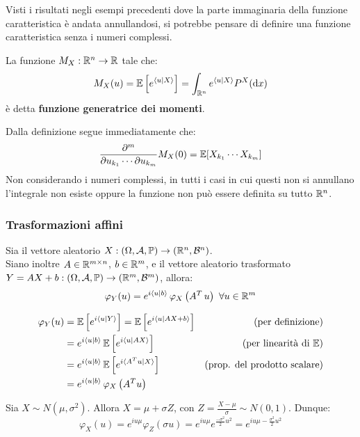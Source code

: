 \medskip
Visti i risultati negli esempi precedenti dove la parte immaginaria della funzione caratteristica è andata annullandosi, si potrebbe pensare di definire una funzione caratteristica senza i numeri complessi.
\begin{defn}\label{funz-gen-mom}
  La funzione $M_X:\mathbb R^n \to \mathbb R$ tale che:
  $$M_X(u)=\mathbb E\left[e^{\langle u|X\rangle}\right]=\int_{\mathbb R^n}e^{\langle u|X\rangle}P^X(\mathrm d x)$$
  è detta \textbf{funzione generatrice dei momenti}.
\end{defn}

Dalla definizione segue immediatamente che:
$$\frac{\partial^m}{\partial u_{k_1} \cdots \partial u_{k_m}}M_X(0)=\mathbb E[X_{k_1} \cdots X_{k_m}]$$
Non considerando i numeri complessi, in tutti i casi in cui questi non si annullano l'integrale non esiste oppure la funzione non può essere definita su tutto $\mathbb R^n$.

\subsubsection{Trasformazioni affini}

\begin{teob}[\JPTh{13.3}]\label{phi-trasf-aff}
  Sia il vettore aleatorio $X : \DoCo$. \\
  Siano inoltre $A\in \mathbb R^{m\times n}$, $b\in \mathbb R^m$, e il vettore aleatorio trasformato $Y=AX+b : \DoCo[m]$, allora:
  $$\varphi_Y(u)=e^{i\langle u|b\rangle} \, \varphi_X\left(A^T \, u\right) \ \forall u \in \mathbb R^m$$
\end{teob}

\begin{dimo}\belowdisplayskip=-14pt
\Fixvmode
  \begin{align*}
    \varphi_Y(u) & =\mathbb E\left[e^{i\langle u|Y\rangle}\right]
    =\mathbb E\left[e^{i\langle u|AX+b\rangle}\right] & (\text{per definizione})\\
    &=e^{i\langle u|b\rangle} \, \mathbb E\left[e^{i\langle u|AX\rangle}\right] & (\text{per linearità di } \mathbb E)\\
    &=e^{i\langle u|b\rangle} \, \mathbb E\left[e^{i\langle A^Tu|X\rangle}\right] & (\text{prop. del prodotto scalare})\\
    &=e^{i\langle u|b\rangle} \, \varphi_X\left(A^Tu\right)
  \end{align*}\qedhere
\end{dimo}

\bigskip
\begin{ese}
\label{ese-caratt-normale-generica}
Sia $X\sim N(\mu,\sigma^2)$. Allora $X=\mu+\sigma Z$, con $Z=\frac{X-\mu}{\sigma}\sim N(0,1)$. Dunque:
$$\varphi_X (u)=e^{i u \mu}\varphi_Z(\sigma u)=  e^{i u \mu}e^{\frac{-\sigma^2}{2}u^2} =e^{i u \mu-\frac{\sigma^2}{2}u^2}$$
\end{ese}

